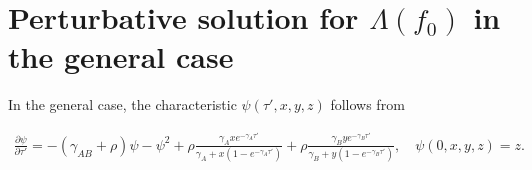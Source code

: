 \documentclass[11pt]{article}
\begin{document}

\section*{Perturbative solution for $\Lambda(f_0)$ in the general case}

In the general case, the characteristic $\psi(\tau', x, y, z)$ follows from 

\begin{align}\label{eq:z_characteristic_neutral}
    \frac{\partial \psi}{\partial \tau'} = -(\gamma_{AB} + \rho) \psi -\psi^2 + \rho \frac{\gamma_Axe^{-\gamma_A\tau'}}{\gamma_A+x(1-e^{-\gamma_A\tau'})} + \rho \frac{\gamma_Bye^{-\gamma_B\tau'}}{\gamma_B+y(1-e^{-\gamma_B\tau'})}, \quad \psi(0, x, y, z) = z.
\end{align}\\
\end{document}
